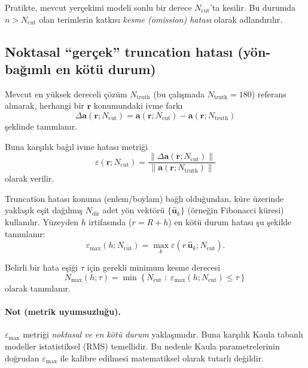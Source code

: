 Pratikte, mevcut yerçekimi modeli sonlu bir derece $N_{\mathrm{cut}}$’ta kesilir. Bu durumda $n > N_{\mathrm{cut}}$ olan terimlerin katkısı \emph{kesme (omission) hatası} olarak adlandırılır.

\subsection{Noktasal “gerçek” truncation hatası (yön-bağımlı en kötü durum)}
Mevcut en yüksek dereceli çözüm $N_{\mathrm{truth}}$ (bu çalışmada $N_{\mathrm{truth}}=180$) referans alınarak, herhangi bir $\mathbf{r}$ konumundaki ivme farkı
\begin{equation}
\Delta\mathbf{a}(\mathbf{r};N_{\mathrm{cut}})
=
\mathbf{a}(\mathbf{r};N_{\mathrm{cut}})
-
\mathbf{a}(\mathbf{r};N_{\mathrm{truth}})
\label{eq:delta_a}
\end{equation}
şeklinde tanımlanır.

Buna karşılık bağıl ivme hatası metriği
\begin{equation}
\varepsilon(\mathbf{r};N_{\mathrm{cut}})
=
\frac{\left\|\Delta\mathbf{a}(\mathbf{r};N_{\mathrm{cut}})\right\|}
{\left\|\mathbf{a}(\mathbf{r};N_{\mathrm{truth}})\right\|}
\label{eq:rel_err_pointwise}
\end{equation}
olarak verilir.

Truncation hatası konuma (enlem/boylam) bağlı olduğundan, küre üzerinde yaklaşık eşit dağılmış $N_{\mathrm{dir}}$ adet yön vektörü $\{\hat{\mathbf{u}}_k\}$ (örneğin Fibonacci küresi) kullanılır. Yüzeyden $h$ irtifasında ($r=R+h$) en kötü durum hatası şu şekilde tanımlanır:
\begin{equation}
\varepsilon_{\max}(h;N_{\mathrm{cut}})
=
\max_{k}
\varepsilon\!\left(r\,\hat{\mathbf{u}}_k;N_{\mathrm{cut}}\right).
\label{eq:worst_case_err}
\end{equation}

Belirli bir hata eşiği $\tau$ için gerekli minimum kesme derecesi
\begin{equation}
N_{\max}(h;\tau)
=
\min\left\{
N_{\mathrm{cut}} \;:\;
\varepsilon_{\max}(h;N_{\mathrm{cut}})\le \tau
\right\}
\label{eq:Nmax_def}
\end{equation}
olarak tanımlanır.

\paragraph{Not (metrik uyumsuzluğu).}
$\varepsilon_{\max}$ metriği \emph{noktasal ve en kötü durum} yaklaşımıdır. Buna karşılık Kaula tabanlı modeller istatistiksel (RMS) temellidir. Bu nedenle Kaula parametrelerinin doğrudan $\varepsilon_{\max}$ ile kalibre edilmesi matematiksel olarak tutarlı değildir.

